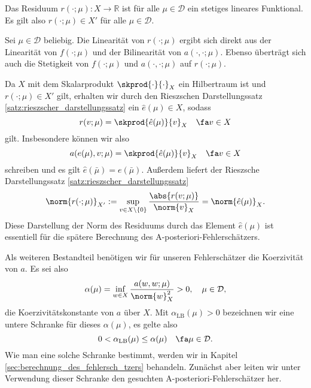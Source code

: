 \begin{Lemma}
    Das Residuum $r(\cdot; \mu) \colon X \to \mathbb{R}$ ist für alle $\mu \in \mathcal D$ ein stetiges lineares Funktional. Es gilt also $r(\cdot; \mu) \in X'$ für alle $\mu \in \mathcal D$.

    \begin{Beweis}
    Sei $\mu \in \mathcal D$ beliebig.
    Die Linearität von $r(\cdot; \mu)$ ergibt sich direkt aus der Linearität von $f(\cdot; \mu)$ und der Bilinearität von $a(\cdot, \cdot; \mu)$.
    Ebenso überträgt sich auch die Stetigkeit von $f(\cdot; \mu)$ und $a(\cdot, \cdot; \mu)$ auf $r(\cdot; \mu)$.
    \end{Beweis}
\end{Lemma}

Da $X$ mit dem Skalarprodukt $\skprod{\cdot}{\cdot}_X$ ein Hilbertraum ist und $r(\cdot; \mu) \in X'$ gilt, erhalten wir durch den Rieszschen Darstellungssatz \ref{satz:rieszscher_darstellungssatz} ein $\hat e(\mu) \in X$, sodass
\begin{equation}
    \label{eq:residuum_riesz}
    r(v; \mu) = \skprod{\hat e(\mu)}{v}_X \quad \fa v \in X
\end{equation}
gilt.
Insbesondere können wir also
\begin{equation}
    \label{eq:a_von_e_gl_skprod_e}
    a(e(\mu), v; \mu) = \skprod{\hat e(\mu)}{v}_X \quad \fa v \in X
\end{equation}
schreiben und es gilt $\hat e(\bar \mu) = e(\bar \mu)$.
Außerdem liefert der Rieszsche Darstellungssatz \ref{satz:rieszscher_darstellungssatz}
\begin{equation}
    \label{eq:residuum_norm_gl_hat_e_norm}
    \norm{r(\cdot; \mu)}_{X'} := \sup_{v \in X \setminus \left\{ 0 \right\}} \frac{\abs{r(v; \mu)}}{\norm{v}_X} = \norm{\hat e(\mu)}_X.
\end{equation}
Diese Darstellung der Norm des Residuums durch das Element $\hat e(\mu)$ ist essentiell für die spätere Berechnung des A-posteriori-Fehlerschätzers.

Als weiteren Bestandteil benötigen wir für unseren Fehlerschätzer die Koerzivität von $a$.
Es sei also
\begin{equation}
            \alpha(\mu) = \inf_{w \in X} \frac{a(w, w; \mu)}{\norm{w}^2_X} > 0, \quad \mu \in \mathcal D,
\end{equation}
die Koerzivitätskonstante von $a$ über $X$.
Mit $\alpha_{\text{LB}}(\mu) > 0$ bezeichnen wir eine untere Schranke für dieses $\alpha(\mu)$, es gelte also
\begin{equation}
    \label{eq:alpha_lb}
    0 < \alpha_{\text{LB}}(\mu) \leq \alpha(\mu) \quad \fa \mu \in \mathcal D.
\end{equation}
Wie man eine solche Schranke bestimmt, werden wir in Kapitel \ref{sec:berechnung_des_fehlersch_tzers} behandeln.
Zunächst aber leiten wir unter Verwendung dieser Schranke den gesuchten A-posteriori-Fehlerschätzer her.

